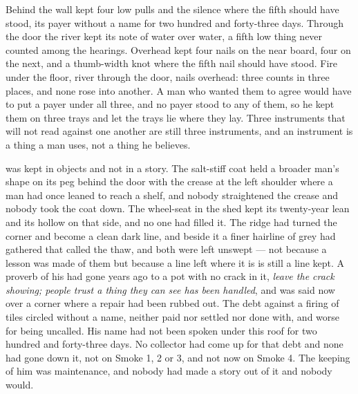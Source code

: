 Behind the wall  kept four low pulls and the silence where the fifth should have stood, its payer without a name for two hundred and forty-three days. Through the door the river kept its note of water over water, a fifth low thing never counted among the hearings. Overhead  kept four nails on the near board, four on the next, and a thumb-width knot where the fifth nail should have stood. Fire under the floor, river through the door, nails overhead: three counts in three places, and none rose into another. A man who wanted them to agree would have to put a payer under all three, and no payer stood to any of them, so he kept them on three trays and let the trays lie where they lay. Three instruments that will not read against one another are still three instruments, and an instrument is a thing a man uses, not a thing he believes.

 was kept in objects and not in a story. The salt-stiff coat held a broader man's shape on its peg behind the door with the crease at the left shoulder where a man had once leaned to reach a shelf, and nobody straightened the crease and nobody took the coat down. The wheel-seat in the shed kept its twenty-year lean and its hollow on that side, and no one had filled it. The  ridge had turned the corner and become a clean dark line, and beside it a finer hairline of grey had gathered that  called the thaw, and both were left unswept --- not because a lesson was made of them but because a line left where it is is still a line kept. A proverb of his had gone years ago to a pot with no crack in it, \emph{leave the crack showing; people trust a thing they can see has been handled}, and was said now over a corner where a repair had been rubbed out. The debt against a firing of tiles circled without a name, neither paid nor settled nor done with, and worse for being uncalled. His name had not been spoken under this roof for two hundred and forty-three days. No collector had come up  for that debt and none had gone down it, not on Smoke 1, 2 or 3, and not now on Smoke 4. The keeping of him was maintenance, and nobody had made a story out of it and nobody would.

\scenebreak

